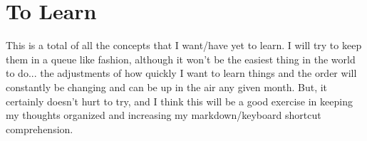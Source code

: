 \documentclass{article}
\begin{document}
\section*{To Learn}
This is a total of all the concepts that I want/have yet to learn. I will try to keep them in a queue like fashion, although it won't be the easiest thing in the world to do... the adjustments of how quickly I want to learn things and the order will constantly be changing and can be up in the air any given month. But, it certainly doesn't hurt to try, and I think this will be a good exercise in keeping my thoughts organized and increasing my markdown/keyboard shortcut comprehension. 
\end{document}
